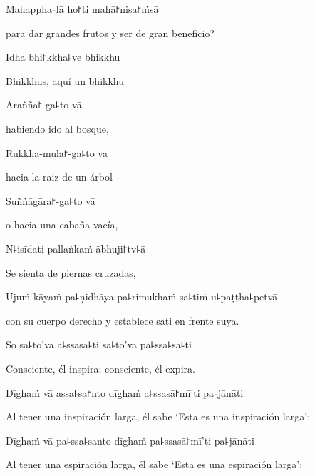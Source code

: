 Mahappha꜕lā ho꜓ti mahā꜓nisa꜓ṁsā

\begin{english}
  para dar grandes frutos y ser de gran beneficio?
\end{english}

Idha bhi꜓kkha꜕ve bhikkhu

\begin{english}
  Bhikkhus, aquí un bhikkhu
\end{english}

Arañña꜓-ga꜕to vā

\begin{english}
  habiendo ido al bosque,
\end{english}

Rukkha-mūla꜓-ga꜕to vā

\begin{english}
  hacia la raiz de un árbol
\end{english}

Suññāgāra꜓-ga꜕to vā

\begin{english}
  o hacia una cabaña vacía,
\end{english}

N꜕isīdati pallaṅkaṁ ābhuji꜓tv꜕ā

\begin{english}
  Se sienta de piernas cruzadas,
\end{english}

Ujuṁ kāyaṁ pa꜕ṇidhāya pa꜕rimukhaṁ sa꜕tiṁ u꜕paṭṭha꜕petvā

\begin{english}
  con su cuerpo derecho y establece sati en frente suya.
\end{english}

So sa꜕to'va a꜕ssasa꜕ti sa꜕to'va pa꜕ssa꜕sa꜕ti

\begin{english}
  Consciente, él inspira; consciente, él expira.
\end{english}

Dīghaṁ vā assa꜕sa꜓nto dīghaṁ a꜕ssasā꜓mī'ti pa꜕jānāti

\begin{english}
  Al tener una inspiración larga, él sabe `Esta es una inspiración larga';
\end{english}

Dīghaṁ vā pa꜕ssa꜕santo dīghaṁ pa꜕ssasā꜓mī'ti pa꜕jānāti

\begin{english}
  Al tener una espiración larga, él sabe `Esta es una espiración larga';
\end{english}

